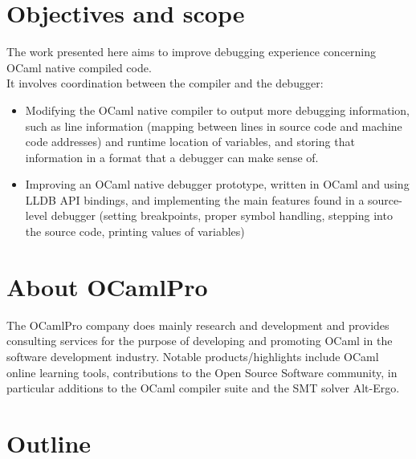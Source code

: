 \section{Objectives and scope\label{sec:objective}}

The work presented here aims to improve debugging experience concerning OCaml
native compiled code. \\
It involves coordination between the compiler and the debugger:

\begin{itemize}
    \item Modifying the OCaml native compiler to output more debugging
        information, such as line information (mapping between lines in source
        code and machine code addresses) and runtime location of variables, and
        storing that information in a format that a debugger can make
        sense of.
    \item  Improving an OCaml native debugger prototype, written in OCaml and using LLDB
        API bindings, and implementing the main features found in a source-level
        debugger (setting breakpoints, proper symbol handling, stepping into the source
        code, printing values of variables)
\end{itemize}

\section{About OCamlPro\label{sec:scope}}

The OCamlPro company does mainly research and development and provides
consulting services for the purpose of developing and promoting OCaml in the
software development industry.
Notable products/highlights include OCaml online learning tools, contributions
to the Open Source Software community, in particular additions to the OCaml
compiler suite and the SMT solver Alt-Ergo.





\section{Outline\label{sec:outline}}

